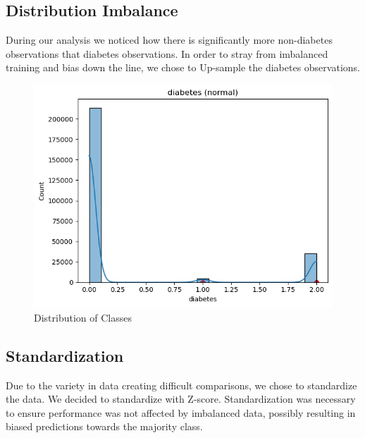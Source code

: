 \documentclass[conference]{IEEEtran}
\begin{document}
\subsection{Distribution Imbalance}
During our analysis we noticed how there is significantly more non-diabetes observations that diabetes observations. In order to stray from imbalanced training and bias down the line, we chose to Up-sample the diabetes observations.

    \begin{figure}[h]
        \centering
        \includegraphics[scale=0.39]{diabetes.png}
        \caption{Distribution of Classes}
        \label{fig:diabetes distribution}
    \end{figure}

\subsection{Standardization}
Due to the variety in data creating difficult comparisons, we chose to standardize the data. We decided to standardize with Z-score. Standardization was necessary to ensure performance was not affected by imbalanced data, possibly resulting in biased predictions towards the majority class.
\end{document}
